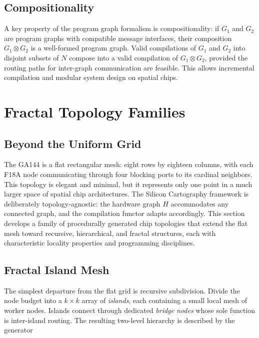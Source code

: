 \documentclass[11pt, a4paper]{article}
\begin{document}
\subsection{Compositionality}

A key property of the program graph formalism is compositionality: if $G_1$ and $G_2$
are program graphs with compatible message interfaces, their composition $G_1 \otimes G_2$
is a well-formed program graph. Valid compilations of $G_1$ and $G_2$ into disjoint
subsets of $N$ compose into a valid compilation of $G_1 \otimes G_2$, provided the
routing paths for inter-graph communication are feasible. This allows incremental
compilation and modular system design on spatial chips.

\section{Fractal Topology Families}

\subsection{Beyond the Uniform Grid}

The GA144 is a flat rectangular mesh: eight rows by eighteen columns, with each F18A
node communicating through four blocking ports to its cardinal neighbors. This topology
is elegant and minimal, but it represents only one point in a much larger space of
spatial chip architectures. The Silicon Cartography framework is deliberately
topology-agnostic: the hardware graph $H$ accommodates any connected graph, and the
compilation functor adapts accordingly. This section develops a family of
procedurally generated chip topologies that extend the flat mesh toward recursive,
hierarchical, and fractal structures, each with characteristic locality properties
and programming disciplines.

\subsection{Fractal Island Mesh}

The simplest departure from the flat grid is recursive subdivision. Divide the
node budget into a $k \times k$ array of \emph{islands}, each containing a small
local mesh of worker nodes. Islands connect through dedicated \emph{bridge nodes}
whose sole function is inter-island routing. The resulting two-level hierarchy is
described by the generator
\end{document}
